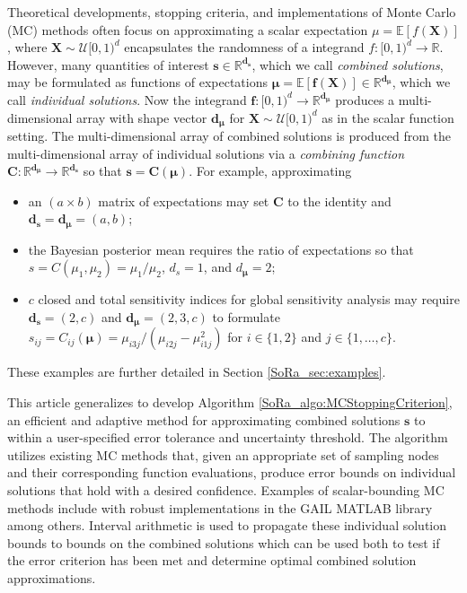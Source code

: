 \documentclass[graybox]{svmult}
\begin{document}
Theoretical developments, stopping criteria, and implementations of Monte Carlo (MC) methods often focus on approximating a scalar expectation $\mu = \mathbb{E}[f(\boldsymbol{X})]$, where $\boldsymbol{X} \sim \mathcal{U}[0,1)^d$ encapsulates the randomness of a integrand $f: [0,1)^d \to \mathbb{R}$. However, many quantities of interest $\boldsymbol{s} \in \mathbb{R}^{\boldsymbol{d}_{\boldsymbol{s}}}$, which we call \emph{combined solutions}, may be formulated as functions of expectations $\boldsymbol{\mu} = \mathbb{E}[\boldsymbol{f}(\boldsymbol{X})] \in \mathbb{R}^{\boldsymbol{d}_{\boldsymbol{\mu}}}$, which we call \emph{individual solutions}. Now the integrand $\boldsymbol{f}: [0,1)^{d} \to \mathbb{R}^{\boldsymbol{d}_{\boldsymbol{\mu}}}$ produces a multi-dimensional array with shape vector $\boldsymbol{d}_{\boldsymbol{\mu}}$ for $\boldsymbol{X} \sim \mathcal{U}[0,1)^d$ as in the scalar function setting. The multi-dimensional array of combined solutions is produced from the multi-dimensional array of individual solutions via a \emph{combining function} $\boldsymbol{C}: \mathbb{R}^{\boldsymbol{d}_{\boldsymbol{\mu}}} \to \mathbb{R}^{\boldsymbol{d}_{\boldsymbol{s}}}$ so that $\boldsymbol{s} = \boldsymbol{C}(\boldsymbol{\mu})$.
For example, approximating
\begin{itemize}
    \item an $(a \times b)$ matrix of expectations may set $\boldsymbol{C}$ to the identity and $\boldsymbol{d}_{\boldsymbol{s}} = \boldsymbol{d}_{\boldsymbol{\mu}} = (a,b)$;
    \item the Bayesian posterior mean requires the ratio of expectations so that $s = C(\mu_1,\mu_2) = \mu_1/\mu_2$, $d_s = 1$, and $d_{\boldsymbol{\mu}} = 2$;
    \item $c$ closed and total sensitivity indices for global sensitivity analysis may require $\boldsymbol{d}_{\boldsymbol{s}} = (2,c)$ and $\boldsymbol{d}_{\boldsymbol{\mu}} = (2,3,c)$ to formulate $s_{ij} = C_{ij}(\boldsymbol{\mu}) =  \mu_{i3j}/(\mu_{i2j}-\mu_{i1j}^2)$ for $i \in \{1,2\}$ and $j \in \{1,\dots,c\}$.
\end{itemize}
These examples are further detailed in Section \ref{SoRa_sec:examples}.

This article generalizes \cite{adaptive_qmc} to develop Algorithm \ref{SoRa_algo:MCStoppingCriterion}, an efficient and adaptive method for approximating combined solutions $\boldsymbol{s}$ to within a user-specified error tolerance and uncertainty threshold. The algorithm utilizes existing MC  methods that, given an appropriate set of sampling nodes and their corresponding function evaluations, produce error bounds on individual solutions that hold with a desired confidence. Examples of scalar-bounding MC methods include \cite{cubmcg,cubqmclattice,cubqmcsobol,cubqmcbayes_thesis,cubqmcbayeslattice} with robust implementations in the GAIL MATLAB library \cite{ChoEtal21a,hickernell2018monte} among others. Interval arithmetic is used to propagate these individual solution bounds to bounds on the combined solutions which can be used both to test if the error criterion has been met and determine optimal combined solution approximations. 
\end{document}
